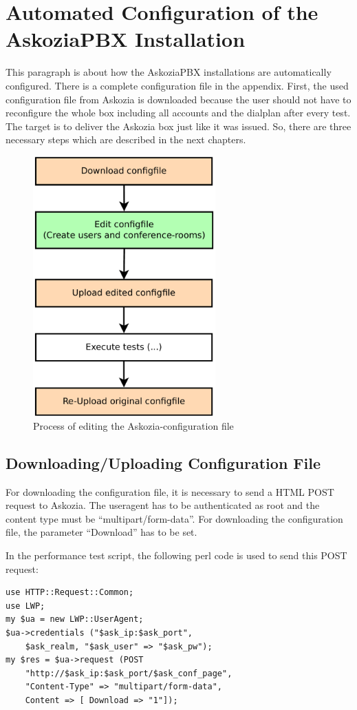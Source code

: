 \section{Automated Configuration of the AskoziaPBX Installation}
\label{sec:configuration}
This paragraph is about how the AskoziaPBX installations are automatically configured.
There is a complete configuration file in the appendix. First, the used configuration file
from Askozia is downloaded because the user should not have to reconfigure the whole box
including all accounts and the dialplan after every test. The target is to deliver
the Askozia box just like it was issued. So, there are three necessary steps which are described in the next chapters.
\begin{figure} [htbp]
\centering
\includegraphics [width=7cm] {configuration-1}
\caption{Process of editing the Askozia-configuration file}
\end{figure}

\subsection{Downloading/Uploading Configuration File}%
For downloading the configuration file, it is necessary to send a HTML POST request to Askozia.
The useragent has to be authenticated as root and the content type must be ``multipart/form-data''.
For downloading the configuration file, the parameter ``Download'' has to be set.

\newpage In the performance test script, the following perl code is used to send this POST request:
\begin{lstlisting}[breaklines=true,label=code:config-post-request-download,caption={POST request for downloading the configuration file} ]
use HTTP::Request::Common;
use LWP;
my $ua = new LWP::UserAgent;
$ua->credentials ("$ask_ip:$ask_port",
	$ask_realm, "$ask_user" => "$ask_pw");
my $res = $ua->request (POST
	"http://$ask_ip:$ask_port/$ask_conf_page",
	"Content-Type" => "multipart/form-data",
	Content => [ Download => "1"]);
\end{lstlisting}

